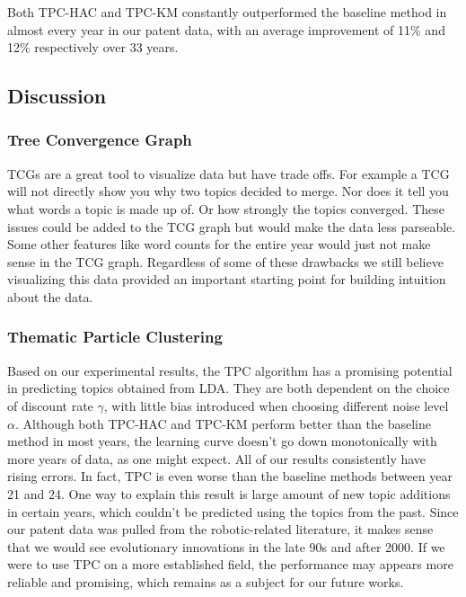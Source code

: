 \documentclass[conference]{IEEEtran}
\begin{document}
Both TPC-HAC and TPC-KM constantly outperformed the baseline method in almost every year in our patent data, with an average improvement of 11\% and 12\% respectively over 33 years.

\subsection{Discussion}

\subsubsection{Tree Convergence Graph}
TCGs are a great tool to visualize data but have trade offs. For example a TCG will not directly show you why two topics decided to merge. Nor does it tell you what words a topic is made up of. Or how strongly the topics converged. These issues could be added to the TCG graph but would make the data less parseable. Some other features like word counts for the entire year would just not make sense in the TCG graph. Regardless of some of these drawbacks we still believe visualizing this data provided an important starting point for building intuition about the data.

\subsubsection{Thematic Particle Clustering}
Based on our experimental results, the TPC algorithm has a promising potential in predicting topics obtained from LDA. They are both dependent on the choice of discount rate $\gamma$, with little bias introduced when choosing different noise level $\alpha$. Although both TPC-HAC and TPC-KM perform better than the baseline method in most years, the learning curve doesn't go down monotonically with more years of data, as one might expect. All of our results consistently have rising errors. In fact, TPC is even worse than the baseline methods between year 21 and 24. One way to explain this result is large amount of new topic additions in certain years, which couldn't be predicted using the topics from the past. Since our patent data was pulled from the robotic-related literature, it makes sense that we would see evolutionary innovations in the late 90s and after 2000. If we were to use TPC on a more established field, the performance may appears more reliable and promising, which remains as a subject for our future works.


\end{document}
